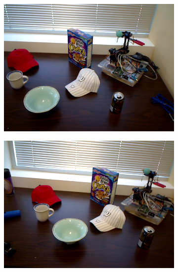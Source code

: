 \begin{figure}
    \centering
    \begin{subfigure}[b]{0.3\textwidth}
        \includegraphics[width=\textwidth]{img/escena_rgbd/table_1_27.png}
    \end{subfigure}
    \quad
    \begin{subfigure}[b]{0.3\textwidth}
        \includegraphics[width=\textwidth]{img/escena_rgbd/table_1_34.png}
    \end{subfigure}
    \quad
    \begin{subfigure}[b]{0.3\textwidth}

\end{subfigure}
\end{figure}
